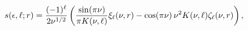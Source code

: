 \[\mathop{s\/}\nolimits\!\left(\epsilon,\ell;r\right)=\frac{(-1)^{\ell}}{2\nu^{1%
/2}}\left(\frac{\mathop{\sin\/}\nolimits\!\left(\pi\nu\right)}{\pi K(\nu,\ell)%
}\xi_{\ell}(\nu,r)-\mathop{\cos\/}\nolimits\!\left(\pi\nu\right)\nu^{2}K(\nu,%
\ell)\zeta_{\ell}(\nu,r)\right),\]